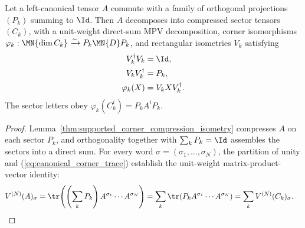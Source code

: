 \begin{lemma}%
    \label{thm:commuting_projection_block_decomp_isometry}
    \leanok
    Let a left-canonical tensor $A$ commute with a family of orthogonal
    projections $(P_k)$ summing to $\Id$. Then $A$ decomposes into compressed
    sector tensors $(C_k)$, with a unit-weight direct-sum MPV decomposition,
    corner isomorphisms
    $\varphi_k:\MN{\dim C_k}\xrightarrow{\sim}P_k\MN{D}P_k$, and
    rectangular isometries $V_k$ satisfying
    \begin{align}
        V_k^\dagger V_k
         & =\Id,
        \notag               \\
        V_kV_k^\dagger
         & =P_k,
        \notag               \\
        \varphi_k(X)
         & =V_kXV_k^\dagger.
        \label{eq:canonical_sector_isometries}
    \end{align}
    The sector letters obey $\varphi_k(C_k^i)=P_kA^iP_k$.
    \begin{proof}\leanok
        Lemma~\ref{thm:supported_corner_compression_isometry} compresses $A$
        on each sector $P_k$, and orthogonality together with $\sum_kP_k=\Id$
        assembles the sectors into a direct sum. For every word
        $\sigma=(\sigma_1,\ldots,\sigma_N)$, the partition of unity and
        (\ref{eq:canonical_corner_trace}) establish the unit-weight
        matrix-product-vector identity:
        \begin{align}
            V^{(N)}(A)_\sigma
             & =
            \tr\!\left(\left(\sum_kP_k\right)
            A^{\sigma_1}\cdots A^{\sigma_N}\right)
            =
            \sum_k\tr(P_kA^{\sigma_1}\cdots A^{\sigma_N})
            =
            \sum_kV^{(N)}(C_k)_\sigma.
            \notag
        \end{align}
    \end{proof}
\end{lemma}

